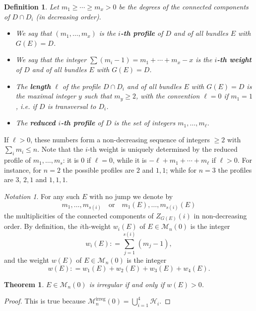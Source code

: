 \documentclass[
  a4paper, 
  reqno, 
  oneside, 
  11pt
]{amsart}
\theoremstyle{plain}	%
\newtheorem{theorem}{Theorem} %
\theoremstyle{mydef} %
\newtheorem{definition}{Definition}
\theoremstyle{remark}
\newtheorem{notation}{Notation}
\theoremstyle{definition}
\theoremstyle{remark}
\DeclareMathOperator{\irreg}{irreg}
\newcommand{\ce}{\mathrel{\mathop:}=}
\begin{document}
\begin{definition}\label{weights}
Let $m_1\ge \cdots \ge m_x>0$ be the degrees  of the connected components of $D\cap D_i$
(in decreasing order).
\begin{itemize}
\item  We say that $(m_1,\dots ,m_x)$ is the {\bf $i$-th    profile} of $D$ and of all bundles $E$ with $G(E)=D$. 
 
\item  We say that the integer $\sum (m_i-1) =m_1+\cdots +m_x-x$ is the {\bf $i$-th weight} of $D$ and of all bundles $E$ with $G(E) =D$. 
 
\item  The {\bf length} $\ell$ of the profile $D\cap D_i$ and of all  bundles $E$ with $G(E)=D$
is the maximal integer $y$ such that $m_y\ge 2$, with the convention $\ell =0$ if $m_1=1$, i.e. if $D$ is transversal to $D_i$. 

\item The {\bf reduced $i$-th profile} of $D$
is the set of integers $m_1,\dots ,m_\ell$.
\end{itemize}
\end{definition}

 If $\ell>0$, these numbers form a non-decreasing sequence of integers $\ge 2$ with $\sum _i m_i\le n$. 
 Note that the $i$-th weight is uniquely determined by the reduced profile of $m_1,\dots ,m_s$: it is $0$ if $\ell =0$, while it is $-\ell+m_1+\cdots +m_\ell$ if $\ell>0$.
For instance, for $n=2$ the possible profiles are $2$ and $1,1$; while for $n=3$ the profiles are $3$, $2,1$ and $1,1,1$.\\

\begin{notation}For any such $E$ with no jump we denote by 
$$m_1,\dots ,m_{s(i)} \quad  \text{or} \quad  m_1(E),\dots ,m_{s(i)}(E)$$
 the multiplicities of the connected components of $Z_{G(E)}(i)$ in non-decreasing order. 
By definition, the $i$th-weight $w_i(E)$ of $E\in \mathcal M_n(0)$ is the integer 
 $$w_i(E)\ce \sum _{j=1}^{s(i)} (m_j-1),$$
 and the weight $w(E)$ of $E\in \mathcal M_n(0)$ is the integer $$w(E)\ce w_1(E)+w_2(E)+w_3(E)+w_4(E).$$
\end{notation}

\begin{theorem}\label{irregw} $E\in \mathcal M_n(0)$ is irregular if and only if $w(E)>0$.
\end{theorem}
\begin{proof} This is true because $\mathcal M_n^{\irreg}(0) = \bigcup_{i=1}^4 \mathcal H_i. $
\end{proof}
\end{document}

